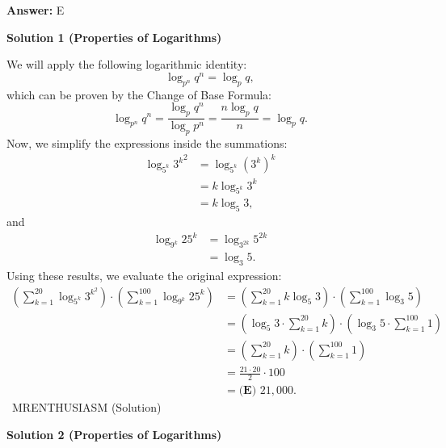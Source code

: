 \begin{enumerate}
 \textbf{Answer: }E



\textbf{Solution 1 (Properties of Logarithms)}

We will apply the following logarithmic identity:
 \[\log_{p^n}{q^n}=\log_{p}{q},\]which can be proven by the Change of Base Formula: 
 \[\log_{p^n}{q^n}=\frac{\log_{p}{q^n}}{\log_{p}{p^n}}=\frac{n\log_{p}{q}}{n}=\log_{p}{q}.\]Now, we simplify the expressions inside the summations:
 \begin{align*} \log_{5^k}{{3^k}^2}&=\log_{5^k}{(3^k)^k} \\ &=k\log_{5^k}{3^k} \\ &=k\log_{5}{3}, \end{align*}
and 
 \begin{align*} \log_{9^k}{25^k}&=\log_{3^{2k}}{5^{2k}} \\ &=\log_{3}{5}. \end{align*}
Using these results, we evaluate the original expression:
 \begin{align*} \left(\sum_{k=1}^{20} \log_{5^k} 3^{k^2}\right)\cdot\left(\sum_{k=1}^{100} \log_{9^k} 25^k\right)&=\left(\sum_{k=1}^{20} k\log_{5}{3}\right)\cdot\left(\sum_{k=1}^{100} \log_{3}{5}\right) \\ &= \left(\log_{5}{3}\cdot\sum_{k=1}^{20} k\right)\cdot\left(\log_{3}{5}\cdot\sum_{k=1}^{100} 1\right) \\ &= \left(\sum_{k=1}^{20} k\right)\cdot\left(\sum_{k=1}^{100} 1\right) \\ &= \frac{21\cdot20}{2}\cdot100 \\ &= \boxed{\textbf{(E) }21{,}000}. \end{align*}
~MRENTHUSIASM (Solution)

 



\textbf{Solution 2 (Properties of Logarithms)}


\end{enumerate}

